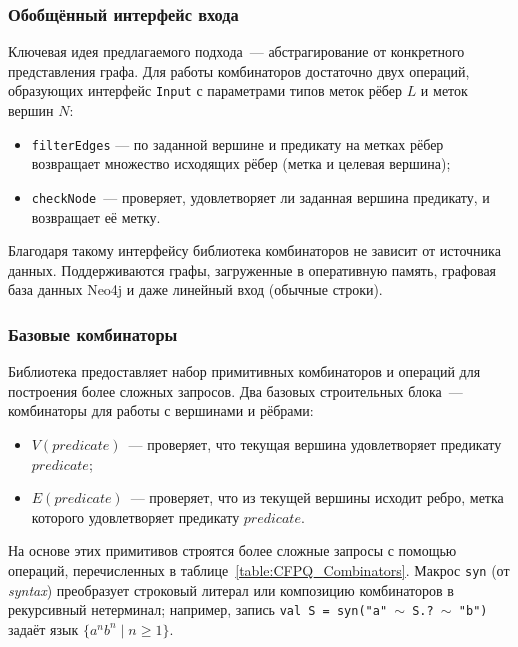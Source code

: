 \subsubsection{Обобщённый интерфейс входа}

Ключевая идея предлагаемого подхода~--- абстрагирование от конкретного представления графа.
Для работы комбинаторов достаточно двух операций, образующих интерфейс \texttt{Input} с параметрами типов меток рёбер $L$ и меток вершин $N$:
\begin{itemize}
    \item \texttt{filterEdges} — по заданной вершине и предикату на метках рёбер возвращает множество исходящих рёбер (метка и целевая вершина);
    \item \texttt{checkNode}~--- проверяет, удовлетворяет ли заданная вершина предикату, и возвращает её метку.
\end{itemize}
Благодаря такому интерфейсу библиотека комбинаторов не зависит от источника данных.
Поддерживаются графы, загруженные в оперативную память, графовая база данных Neo4j и даже линейный вход (обычные строки).

\subsubsection{Базовые комбинаторы}

Библиотека предоставляет набор примитивных комбинаторов и операций для построения более сложных запросов.
Два базовых строительных блока~--- комбинаторы для работы с вершинами и рёбрами:
\begin{itemize}
    \item $V(predicate)$~--- проверяет, что текущая вершина удовлетворяет предикату $predicate$;
    \item $E(predicate)$~--- проверяет, что из текущей вершины исходит ребро, метка которого удовлетворяет предикату $predicate$.
\end{itemize}

На основе этих примитивов строятся более сложные запросы с помощью операций, перечисленных в таблице~\ref{table:CFPQ_Combinators}.
Макрос \texttt{syn} (от \emph{syntax}) преобразует строковый литерал или композицию комбинаторов в рекурсивный нетерминал; например, запись \texttt{val S = syn("a" $\sim$ S.? $\sim$ "b")} задаёт язык $\{a^n b^n \mid n \geq 1\}$.


